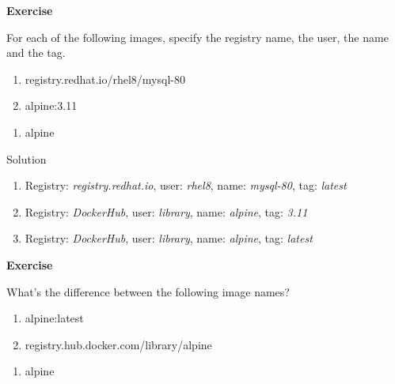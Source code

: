 \documentclass[
]{article}
\providecommand{\tightlist}{%
  \setlength{\itemsep}{0pt}\setlength{\parskip}{0pt}}
\newenvironment{infobox}[1]
  {
  \begin{itemize}
  \renewcommand{\labelitemi}{
    \raisebox{-.7\height}[0pt][0pt]{
      
    }
  }
  \setlength{\fboxsep}{1em}
  \begin{whitebox}
  \item
  }
  {
  \end{whitebox}
  \end{itemize}
  }
\theoremstyle{definition}
\theoremstyle{definition}
\theoremstyle{definition}
\theoremstyle{remark}
\let\BeginKnitrBlock\begin \let\EndKnitrBlock\end
\begin{document}
\begin{infobox}{exercisebox}

\textbf{Exercise}

\BeginKnitrBlock{exercise}
\protect\hypertarget{exr:unnamed-chunk-1}{}{\label{exr:unnamed-chunk-1} }
For each of the following images,
specify the registry name, the user, the name and the tag.

\begin{enumerate}
\def\labelenumi{\arabic{enumi}.}
\item
  registry.redhat.io/rhel8/mysql-80
\item
  alpine:3.11
\end{enumerate}

\begin{enumerate}
\def\labelenumi{\arabic{enumi}.}
\setcounter{enumi}{2}
\tightlist
\item
  alpine
\end{enumerate}
\EndKnitrBlock{exercise}

\end{infobox}

Solution

\begin{infobox}{exercisebox}

\begin{enumerate}
\def\labelenumi{\arabic{enumi}.}
\item
  Registry: \emph{registry.redhat.io}, user: \emph{rhel8}, name: \emph{mysql-80},
  tag: \emph{latest}
\item
  Registry: \emph{DockerHub}, user: \emph{library}, name: \emph{alpine}, tag: \emph{3.11}
\item
  Registry: \emph{DockerHub}, user: \emph{library}, name: \emph{alpine}, tag: \emph{latest}
\end{enumerate}

\end{infobox}

\begin{infobox}{exercisebox}

\textbf{Exercise}

\BeginKnitrBlock{exercise}
\protect\hypertarget{exr:unnamed-chunk-2}{}{\label{exr:unnamed-chunk-2} }What's the difference between the following image names?

\begin{enumerate}
\def\labelenumi{\arabic{enumi}.}
\item
  alpine:latest
\item
  registry.hub.docker.com/library/alpine
\end{enumerate}

\begin{enumerate}
\def\labelenumi{\arabic{enumi}.}
\setcounter{enumi}{2}
\tightlist
\item
  alpine
\end{enumerate}
\EndKnitrBlock{exercise}

\end{infobox}
\end{document}
